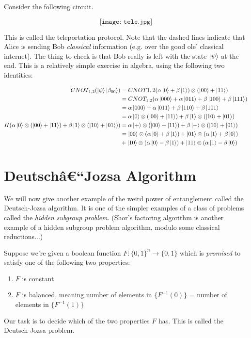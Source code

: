 \documentclass{article}
\begin{document}
Consider the following circuit.

\[
\texttt{[image: tele.jpg]}
\]

This is called the teleportation protocol.  Note that the dashed lines indicate that Alice is sending Bob \emph{classical} information (e.g. over the good ole' classical internet).  The thing to check is that Bob really is left with the state $\ket{\psi}$ at the end.  This is a relatively simple exercise in algebra, using the following two identities: 

\begin{equation*}
\begin{split}
CNOT_{1,2}(\ket{\psi}\ket{\beta_{00}}) &=  CNOT{1,2}(\alpha\ket{0} + \beta\ket{1}) \otimes (\ket{00} + \ket{11})\\
&= CNOT_{1,2}(\alpha\ket{000} + \alpha\ket{011} + \beta\ket{100} + \beta\ket{111} )\\
&= \alpha\ket{000} + \alpha\ket{011} + \beta\ket{110} + \beta\ket{101}\\
&= \alpha\ket{0} \otimes (\ket{00} + \ket{11}) + \beta\ket{1} \otimes (\ket{10} + \ket{01})\\
H(\alpha\ket{0} \otimes (\ket{00} + \ket{11}) + \beta\ket{1} \otimes (\ket{10} + \ket{01})) &= \alpha\ket{+} \otimes (\ket{00} + \ket{11}) + \beta\ket{-} \otimes (\ket{10} + \ket{01})\\
&= \ket{00} \otimes (\alpha\ket{0} + \beta\ket{1}) + \ket{01} \otimes (\alpha\ket{1} + \beta\ket{0})\\ 
& + \ket{10} \otimes (\alpha\ket{0} - \beta\ket{1}) + \ket{11} \otimes (\alpha\ket{1} - \beta\ket{0})
\end{split}
\end{equation*}

\section{Deutschâ€“Jozsa Algorithm}
We will now give another example of the weird power of entanglement called the Deutsch-Jozsa algorithm.  It is one of the simpler examples of a class of problems called the \emph{hidden subgroup problem}.  (Shor's factoring algorithm is another example of a hidden subgroup problem algorithm, modulo some classical reductions...)

Suppose we're given a boolean function $F:\{0,1\}^n \rightarrow \{0,1\}$ which is \emph{promised} to satisfy one of the following two properties:
\begin{enumerate}
    \item $F$ is constant
    \item $F$ is balanced, meaning number of elements in $\{F^{-1}(0)\}$ = number of elements in $\{F^{-1}(1)\}$ 
\end{enumerate}
Our task is to decide which of the two properties $F$ has.  This is called the Deutsch-Jozsa problem.
\end{document}
